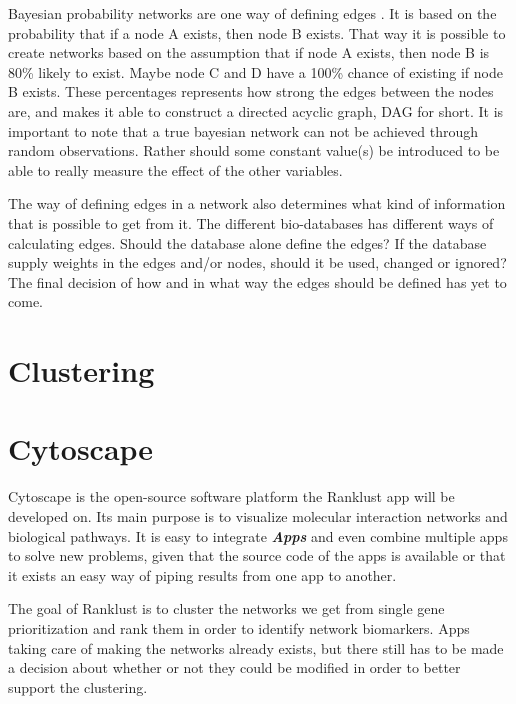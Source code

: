 \documentclass[UKenglish,11pt,a4paper]{article}
\begin{document}
Bayesian probability networks are one way of defining edges \cite{bayesiannetworks}. It is based on the probability that
if a node A exists, then node B exists. That way it is possible to create networks based on the assumption that if node
A exists, then node B is 80\% likely to exist. Maybe node C and D have a 100\% chance of existing if node B exists.
These percentages represents how strong the edges between the nodes are, and makes it able to construct a directed
acyclic graph, DAG for short. It is important to note that a true bayesian network can not be achieved through random 
observations. Rather should some constant value(s) be introduced to be able to really measure the effect of the other
variables.

The way of defining edges in a network also determines what kind of information that is possible to get from it. The
different bio-databases has different ways of calculating edges. Should the database alone define the edges? If the
database supply weights in the edges and/or nodes, should it be used, changed or ignored? The final decision of how and
in what way the edges should be defined has yet to come. 
\section{Clustering}
\section{Cytoscape}
Cytoscape is the open-source software platform the Ranklust app will be developed on. Its main purpose is to visualize
molecular interaction networks and biological pathways.  It is easy to integrate \textbf{\textit{Apps}} and even combine 
multiple apps to solve new problems, given that the source code of the apps is available or that it exists an easy way of 
piping results from one app to another. 

The goal of Ranklust is to cluster the networks we get from single gene prioritization and rank them in order to 
identify network biomarkers. Apps taking care of making the networks already exists, but there still has to be made a 
decision about whether or not they could be modified in order to better support the clustering.
\end{document}
